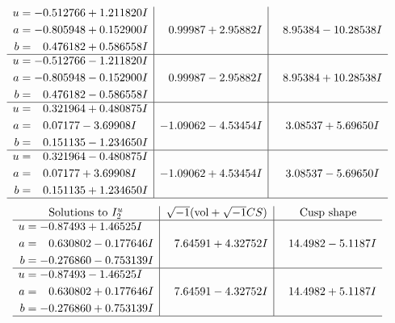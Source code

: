 \documentclass[1p]{elsarticle_modified}
\theoremstyle{definition}
\newcommand{\I}{\sqrt{-1}}
\begin{document}
$$\begin{array}{c|c|c}
\begin{aligned}
u &= -0.512766 + 1.211820 I \\
a &= -0.805948 + 0.152900 I \\
b &= \phantom{-}0.476182 + 0.586558 I\end{aligned}
 & \phantom{-}0.99987 + 2.95882 I & \phantom{-}8.95384 - 10.28538 I \\ \hline\begin{aligned}
u &= -0.512766 - 1.211820 I \\
a &= -0.805948 - 0.152900 I \\
b &= \phantom{-}0.476182 - 0.586558 I\end{aligned}
 & \phantom{-}0.99987 - 2.95882 I & \phantom{-}8.95384 + 10.28538 I \\ \hline\begin{aligned}
u &= \phantom{-}0.321964 + 0.480875 I \\
a &= \phantom{-}0.07177 - 3.69908 I \\
b &= \phantom{-}0.151135 - 1.234650 I\end{aligned}
 & -1.09062 - 4.53454 I & \phantom{-}3.08537 + 5.69650 I \\ \hline\begin{aligned}
u &= \phantom{-}0.321964 - 0.480875 I \\
a &= \phantom{-}0.07177 + 3.69908 I \\
b &= \phantom{-}0.151135 + 1.234650 I\end{aligned}
 & -1.09062 + 4.53454 I & \phantom{-}3.08537 - 5.69650 I\\
 \hline 
 \end{array}$$\newpage$$\begin{array}{c|c|c}  
\text{Solutions to }I^u_{2}& \I (\text{vol} + \sqrt{-1}CS) & \text{Cusp shape}\\
 \hline 
\begin{aligned}
u &= -0.87493 + 1.46525 I \\
a &= \phantom{-}0.630802 - 0.177646 I \\
b &= -0.276860 - 0.753139 I\end{aligned}
 & \phantom{-}7.64591 + 4.32752 I & \phantom{-}14.4982 - 5.1187 I \\ \hline\begin{aligned}
u &= -0.87493 - 1.46525 I \\
a &= \phantom{-}0.630802 + 0.177646 I \\
b &= -0.276860 + 0.753139 I\end{aligned}
 & \phantom{-}7.64591 - 4.32752 I & \phantom{-}14.4982 + 5.1187 I\\
 \hline 
 \end{array}$$\newpage
\end{document}
